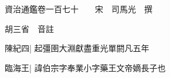 






























































資治通鑑卷一百七十　　宋　司馬光　撰

胡三省　音註

陳紀四|{
	起彊圉大淵獻盡重光單閼凡五年}


臨海王|{
	諱伯宗字奉業小字藥王文帝嫡長子也}



